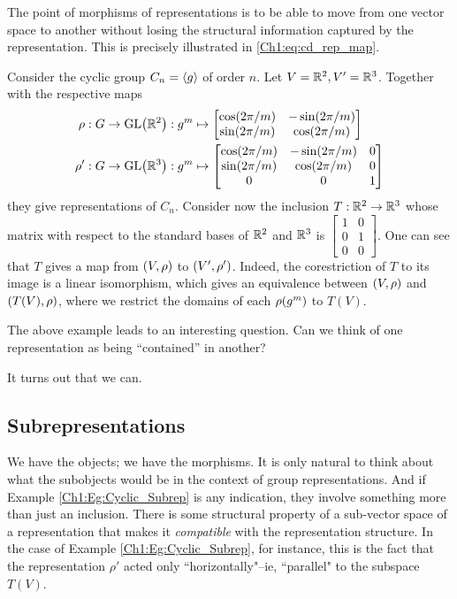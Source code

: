 The point of morphisms of representations is to be able to move from one vector space to another without losing the structural information captured by the representation. This is precisely illustrated in \eqref{Ch1:eq:cd_rep_map}.

\begin{boxexample} \label{Ch1:Eg:Cyclic_Subrep}
    Consider the cyclic group $C_n = \left\langle g \right\rangle$ of order $n$. Let $V = \mathbb{R}^2, V' = \mathbb{R}^3$. Together with the respective maps
    \begin{align*}
        \rho : G \to \GL{\R^2} &: g^m \mapsto \begin{bmatrix}
            \pcos{2\pi/m} & -\psin{2\pi/m} \\
            \psin{2\pi/m} & \pcos{2\pi/m}
        \end{bmatrix} \\
        \rho' : G \to \GL{\R^3} &: g^m \mapsto \begin{bmatrix}
            \pcos{2\pi/m} & -\psin{2\pi/m} & 0 \\
            \psin{2\pi/m} & \pcos{2\pi/m} & 0 \\
            0 & 0 & 1
        \end{bmatrix}
    \end{align*}
    they give representations of $C_n$. Consider now the inclusion $T : \mathbb{R}^2 \to \mathbb{R}^3$ whose matrix with respect to the standard bases of $\mathbb{R}^2$ and $\mathbb{R}^3$ is $\begin{bmatrix}
        1 & 0 \\ 0 & 1 \\ 0 & 0
    \end{bmatrix}$. One can see that $T$ gives a map from $\left( V, \rho \right)$ to $\left( V', \rho' \right)$. Indeed, the corestriction of $T$ to its image is a linear isomorphism, which gives an equivalence between $\left( V, \rho \right)$ and $\left( T(V), \rho \right)$, where we restrict the domains of each $\rho\!\left( g^m \right)$ to $T(V)$.
\end{boxexample}
The above example leads to an interesting question. Can we think of one representation as being ``contained'' in another?

It turns out that we can.

\subsection{Subrepresentations} \label{Ch1:Subsec:Subreps}

We have the objects; we have the morphisms. It is only natural to think about what the subobjects would be in the context of group representations. And if Example \ref{Ch1:Eg:Cyclic_Subrep} is any indication, they involve something more than just an inclusion. There is some structural property of a sub-vector space of a representation that makes it \textit{compatible} with the representation structure. In the case of Example \ref{Ch1:Eg:Cyclic_Subrep}, for instance, this is the fact that the representation $\rho'$ acted only ``horizontally"--ie, ``parallel" to the subspace $T(V)$.


